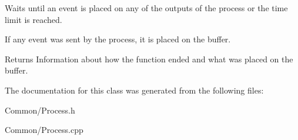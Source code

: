 Waits until an event is placed on any of the outputs of the process or the time limit is reached. 

If any event was sent by the process, it is placed on the buffer.

\begin{DoxyReturn}{Returns}
Information about how the function ended and what was placed on the buffer. 
\end{DoxyReturn}


The documentation for this class was generated from the following files\-:\begin{DoxyCompactItemize}
\item 
Common/Process.\-h\item 
Common/Process.\-cpp\end{DoxyCompactItemize}
